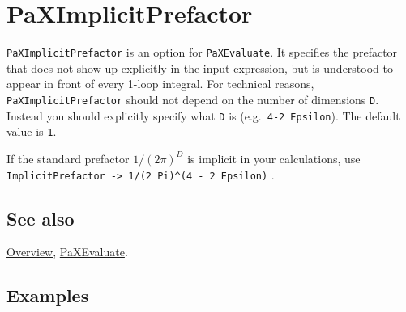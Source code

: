 \documentclass[../FeynHelpersManual.tex]{subfiles}
\begin{document}
\hypertarget{paximplicitprefactor}{
\section{PaXImplicitPrefactor}\label{paximplicitprefactor}}

\texttt{PaXImplicitPrefactor} is an option for \texttt{PaXEvaluate}. It
specifies the prefactor that does not show up explicitly in the input
expression, but is understood to appear in front of every 1-loop
integral. For technical reasons, \texttt{PaXImplicitPrefactor} should
not depend on the number of dimensions \texttt{D}. Instead you should
explicitly specify what \texttt{D} is (e.g.~\texttt{4-2 Epsilon}). The
default value is \texttt{1}.

If the standard prefactor \(1/(2 \pi)^D\) is implicit in your
calculations, use \texttt{ImplicitPrefactor -> 1/(2 Pi)^(4 - 2 Epsilon)}
.

\subsection{See also}

\hyperlink{toc}{Overview}, \hyperlink{paxevaluate}{PaXEvaluate}.

\subsection{Examples}
\end{document}
